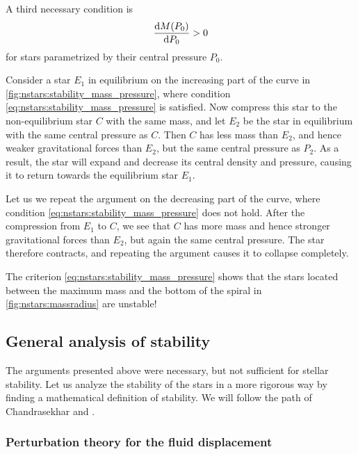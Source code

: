 A third necessary condition is
\begin{equation}
	\odv{M(P_0)}{P_0} > 0
\label{eq:nstars:stability_mass_pressure}
\end{equation}
for stars parametrized by their central pressure $P_0$.

Consider a star $E_1$ in equilibrium on the increasing part of the curve in \cref{fig:nstars:stability_mass_pressure}, where condition \eqref{eq:nstars:stability_mass_pressure} is satisfied.
Now compress this star to the non-equilibrium star $C$ with the same mass, and let $E_2$ be the star in equilibrium with the same central pressure as $C$.
Then $C$ has less mass than $E_2$, and hence weaker gravitational forces than $E_2$, but the same central pressure as $P_2$.
As a result, the star will expand and decrease its central density and pressure, causing it to return towards the equilibrium star $E_1$.

Let us we repeat the argument on the decreasing part of the curve, where condition \eqref{eq:nstars:stability_mass_pressure} does not hold.
After the compression from $E_1$ to $C$, we see that $C$ has more mass and hence stronger gravitational forces than $E_2$, but again the same central pressure.
The star therefore contracts, and repeating the argument causes it to collapse completely.

The criterion \eqref{eq:nstars:stability_mass_pressure} shows that the stars located between the maximum mass and the bottom of the spiral in \cref{fig:nstars:massradius} are unstable!

\subsection{General analysis of stability}
\label{sec:nstars:stability_general}

The arguments presented above were necessary, but not sufficient for stellar stability.
Let us analyze the stability of the stars in a more rigorous way by finding a mathematical definition of stability.
We will follow the path of Chandrasekhar \cite{ref:chandrasekhar_stability} and \cite[§ 26.4d]{ref:mtw}.

\subsubsection{Perturbation theory for the fluid displacement}

